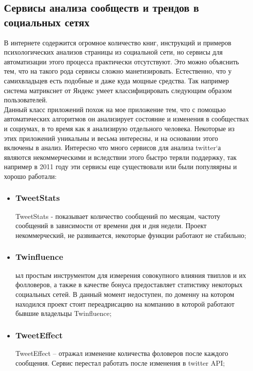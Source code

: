 \begin{chap1}
\subsection{Сервисы анализа сообществ и трендов в социальных сетях}
В интернете содержится огромное количество книг, инструкций и примеров психологических анализов страницы из социальной сети, но сервисы для автоматизации этого процесса практически отсутствуют. Это можно объяснить тем, что на такого рода сервисы сложно манетизировать. Естественно, что у самихвладьцев есть подобные и даже куда мощные средства. Так например система матрикснет от Яндекс умеет классифицировать следующим образом пользователей.\\ %

Данный класс приложений похож на мое приложение тем, что с помощью автоматических алгоритмов  он анализирует состояние и изменения в сообществах и социумах, в то время как я анализирую отдельного человека. Некоторые из этих приложений уникальны и весьма интересны, и на основании этого включены в анализ. Интересно что много сервисов для анализа twitter`а являются некоммерческими и вследствии этого быстро теряли поддержку, так например в 2011 году эти сервисы еще существовали или были популяярны и хорошо работали:
\begin{itemize}
\item \subsubsection{TweetStats}
TweetStats - показывает количество сообщений по месяцам, частоту сообщений в зависимости от времени дня и дня недели. Проект некоммерческий, не развивается, некоторые функции работают не стабильно;
\item \subsubsection{Twinfluence}
ыл простым инструментом для измерения совокупного влияния твиплов и их фолловеров, а также в качестве бонуса предоставляет статистику некоторых социальных сетей. В данный момент недоступен, по доменну на котором находился проект стоит переадрисацию на компанию в которой работают бывшие владельцы Twinfluence;
\item \subsubsection{TweetEffect}
TweetEffect – отражал изменение количества фоловеров после каждого сообщения. Сервис перестал работать после изменения в twitter API;

\end{itemize}
\end{chap1}
